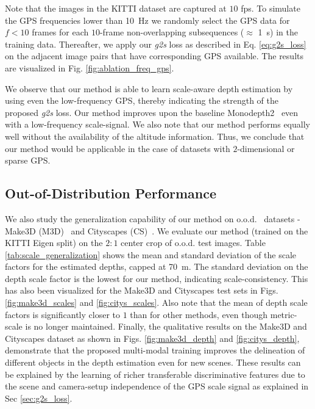 Note that the images in the KITTI dataset are captured at $10$ fps. To simulate the GPS frequencies lower than \SI{10}{\Hz} 
we randomly select the GPS data for $f<10$ frames for each $10$-frame non-overlapping subsequences ($\approx$ \SI{1}{s}) in the training data. Thereafter, we apply our \textit{g2s} loss as described in Eq. \ref{eq:g2s_loss} on the adjacent image pairs that have corresponding GPS available. The results are visualized in Fig. \ref{fig:ablation_freq_gps}.

We observe that our method is able to learn scale-aware depth estimation by using even the low-frequency GPS, thereby indicating the strength of the proposed \textit{g2s} loss. Our method improves upon the baseline Monodepth2~\cite{godard2019digging} even with a low-frequency scale-signal.
We also note that our method performs equally well without the availability of the altitude information. Thus, we conclude that our method would be applicable in the case of datasets with $2$-dimensional or sparse GPS. 






\subsection{Out-of-Distribution Performance}
\label{sec:ood}
We also study the generalization capability of our method on o.o.d.~\cite{geirhos2020shortcut} datasets - Make3D (M3D)~\cite{saxena2008make3d} and Cityscapes (CS)~\cite{cordts2016cityscapes}. We evaluate our method (trained on the KITTI Eigen split) on the $2:1$ center crop of o.o.d. test images. Table \ref{tab:scale_generalization} shows the mean and standard deviation of the scale factors for the estimated depths, capped at \SI{70}{\m}. The standard deviation on the depth scale factor is the lowest for our method, indicating scale-consistency. This has also been visualized for the Make3D and Cityscapes test sets in Figs. \ref{fig:make3d_scales} and \ref{fig:citys_scales}. Also note that the mean of depth scale factors is significantly closer to $1$ than for other methods, even though metric-scale is no longer maintained. Finally, the qualitative results on the Make3D and Cityscapes dataset as shown in Figs. \ref{fig:make3d_depth} and \ref{fig:citys_depth},  demonstrate that the proposed multi-modal training improves the delineation of different objects in the depth estimation even for new scenes.  These results can be explained by the  learning of richer transferable discriminative features due to the scene and camera-setup independence of the GPS scale signal as explained in Sec \ref{sec:g2s_loss}. 





